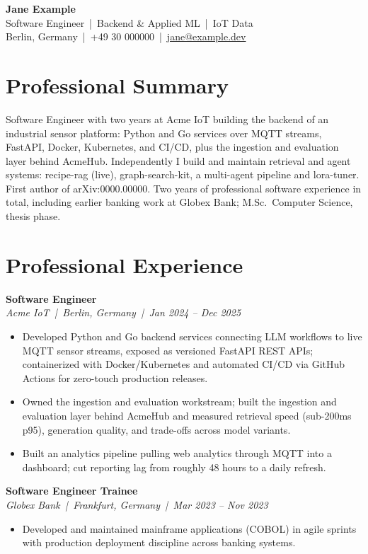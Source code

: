 \documentclass[a4paper,10pt]{article}
\newcommand{\jobtitle}[4]{\textbf{#1} \\ {\small\color{graytext}\textit{#2 \,|\, #3 \,|\, #4}}\vspace{2pt}}
\begin{document}
\begin{center}
  {\LARGE\bfseries\color{accent} Jane Example} \\[4pt]
  {\color{graytext} Software Engineer \,|\, Backend \& Applied ML \,|\, IoT Data} \\[3pt]
  {\small Berlin, Germany \,|\, +49 30 000000 \,|\, \href{mailto:jane@example.dev}{jane@example.dev}}
\end{center}

\section{Professional Summary}
Software Engineer with two years at Acme IoT building the backend of an industrial sensor platform: Python and Go services over MQTT streams, FastAPI, Docker, Kubernetes, and CI/CD, plus the ingestion and evaluation layer behind AcmeHub. Independently I build and maintain retrieval and agent systems: recipe-rag (live), graph-search-kit, a multi-agent pipeline and lora-tuner. First author of arXiv:0000.00000. Two years of professional software experience in total, including earlier banking work at Globex Bank; M.Sc.\ Computer Science, thesis phase.

\section{Professional Experience}

\jobtitle{Software Engineer}{Acme IoT}{Berlin, Germany}{Jan 2024 -- Dec 2025}
\begin{itemize}
  \item Developed Python and Go backend services connecting LLM workflows to live MQTT sensor streams, exposed as versioned FastAPI REST APIs; containerized with Docker/Kubernetes and automated CI/CD via GitHub Actions for zero-touch production releases.
  \item Owned the ingestion and evaluation workstream; built the ingestion and evaluation layer behind AcmeHub and measured retrieval speed (sub-200ms p95), generation quality, and trade-offs across model variants.
  \item Built an analytics pipeline pulling web analytics through MQTT into a dashboard; cut reporting lag from roughly 48 hours to a daily refresh.
\end{itemize}

\jobtitle{Software Engineer Trainee}{Globex Bank}{Frankfurt, Germany}{Mar 2023 -- Nov 2023}
\begin{itemize}
  \item Developed and maintained mainframe applications (COBOL) in agile sprints with production deployment discipline across banking systems.
\end{itemize}
\end{document}
